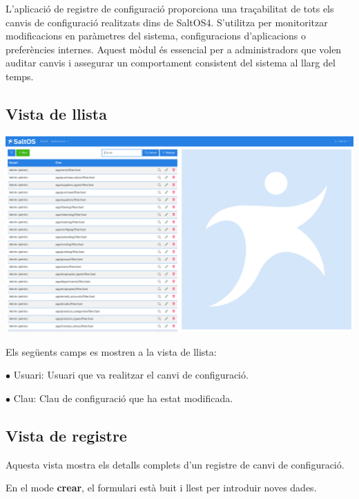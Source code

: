 \documentclass[a4paper]{article}
\begin{document}
L'aplicació de registre de configuració proporciona una traçabilitat de tots els canvis de configuració realitzats dins de SaltOS4.
S'utilitza per monitoritzar modificacions en paràmetres del sistema, configuracions d'aplicacions o preferències internes.
Aquest mòdul és essencial per a administradors que volen auditar canvis i assegurar un comportament consistent del sistema al llarg del temps.

\hypertarget{toc8}{}
\subsection{Vista de llista}

\begin{center}\includegraphics[width=1\textwidth]{../ujest/snaps/test-screenshots-js-screenshots-common-configlog-list-ca-es-1-snap.png}\end{center}

Els següents camps es mostren a la vista de llista:

\begin{compactitem}
\item[\color{myblue}$\bullet$] Usuari: Usuari que va realitzar el canvi de configuració.
\item[\color{myblue}$\bullet$] Clau: Clau de configuració que ha estat modificada.
\end{compactitem}

\hypertarget{toc9}{}
\subsection{Vista de registre}

Aquesta vista mostra els detalls complets d'un registre de canvi de configuració.

En el mode \textbf{crear}, el formulari està buit i llest per introduir noves dades.
\end{document}
